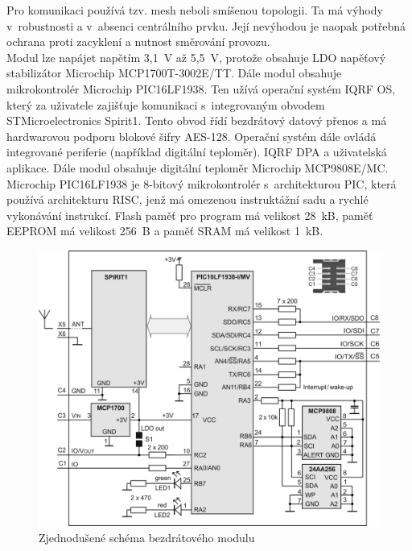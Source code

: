 \documentclass[12pt,a4paper]{article}
\begin{document}
Pro komunikaci používá tzv. mesh neboli smíšenou topologii. Ta má výhody v~robustnosti a v~absenci centrálního prvku. Její nevýhodou je naopak potřebná ochrana proti zacyklení a nutnost směrování provozu. \\

Modul lze napájet napětím 3,1~V až 5,5~V, protože obsahuje LDO napěťový stabilizátor Microchip MCP1700T-3002E/TT. Dále modul obsahuje mikrokontrolér Microchip PIC16LF1938. Ten užívá operační systém IQRF OS, který za uživatele zajišťuje komunikaci s~integrovaným obvodem STMicroelectronics Spirit1. Tento obvod řídí bezdrátový datový přenos a má hardwarovou podporu blokové šifry AES-128. Operační systém dále ovládá integrované periferie (například digitální teploměr). IQRF DPA a uživatelská aplikace. Dále modul obsahuje digitální teploměr Microchip MCP9808E/MC. \\

Microchip PIC16LF1938 je 8-bitový mikrokontrolér s~architekturou PIC, která používá architekturu RISC, jenž má omezenou instruktážní sadu a rychlé vykonávání instrukcí. Flash paměť pro program má velikost 28~kB, paměť EEPROM má velikost 256~B a paměť SRAM má velikost 1~kB.

\begin{figure}[H]
\centering
\label{fig:iqrf/zjednodusene-schema}
\includegraphics[width = 128mm]{img/iqrf/dctr-72dat-zjednodusene-schema.png}
\caption{Zjednodušené schéma bezdrátového modulu}
\end{figure}
\end{document}
